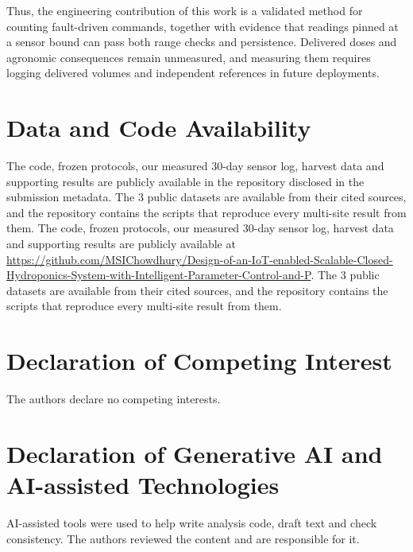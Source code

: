 \documentclass[preprint,12pt,doubleblind]{elsarticle}
\begin{document}
Thus, the engineering contribution of this work is a validated method for counting fault-driven commands, together with evidence that readings pinned at a sensor bound can pass both range checks and persistence. Delivered doses and agronomic consequences remain unmeasured, and measuring them requires logging delivered volumes and independent references in future deployments.

\section*{Data and Code Availability}
\ifdefined\AUDITBLINDED
The code, frozen protocols, our measured 30-day sensor log, harvest data and supporting results are publicly available in the repository disclosed in the submission metadata. The 3 public datasets are available from their cited sources, and the repository contains the scripts that reproduce every multi-site result from them.
\else
The code, frozen protocols, our measured 30-day sensor log, harvest data and supporting results are publicly available at \url{https://github.com/MSIChowdhury/Design-of-an-IoT-enabled-Scalable-Closed-Hydroponics-System-with-Intelligent-Parameter-Control-and-P}. The 3 public datasets are available from their cited sources, and the repository contains the scripts that reproduce every multi-site result from them.
\fi

\section*{Declaration of Competing Interest}
The authors declare no competing interests.

\section*{Declaration of Generative AI and AI-assisted Technologies}
AI-assisted tools were used to help write analysis code, draft text and check consistency. The authors reviewed the content and are responsible for it.


{\small}
\end{document}
